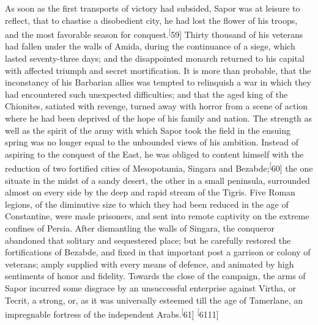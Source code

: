 As soon as the first transports of victory had subsided, Sapor
was at leisure to reflect, that to chastise a disobedient city,
he had lost the flower of his troops, and the most favorable
season for conquest.\textsuperscript[59] Thirty thousand of his veterans had
fallen under the walls of Amida, during the continuance of a
siege, which lasted seventy-three days; and the disappointed
monarch returned to his capital with affected triumph and secret
mortification. It is more than probable, that the inconstancy of
his Barbarian allies was tempted to relinquish a war in which
they had encountered such unexpected difficulties; and that the
aged king of the Chionites, satiated with revenge, turned away
with horror from a scene of action where he had been deprived of
the hope of his family and nation. The strength as well as the
spirit of the army with which Sapor took the field in the ensuing
spring was no longer equal to the unbounded views of his
ambition. Instead of aspiring to the conquest of the East, he was
obliged to content himself with the reduction of two fortified
cities of Mesopotamia, Singara and Bezabde;\textsuperscript[60] the one situate in
the midst of a sandy desert, the other in a small peninsula,
surrounded almost on every side by the deep and rapid stream of
the Tigris. Five Roman legions, of the diminutive size to which
they had been reduced in the age of Constantine, were made
prisoners, and sent into remote captivity on the extreme confines
of Persia. After dismantling the walls of Singara, the conqueror
abandoned that solitary and sequestered place; but he carefully
restored the fortifications of Bezabde, and fixed in that
important post a garrison or colony of veterans; amply supplied
with every means of defence, and animated by high sentiments of
honor and fidelity. Towards the close of the campaign, the arms
of Sapor incurred some disgrace by an unsuccessful enterprise
against Virtha, or Tecrit, a strong, or, as it was universally
esteemed till the age of Tamerlane, an impregnable fortress of
the independent Arabs.\textsuperscript[61] \textsuperscript[6111]


